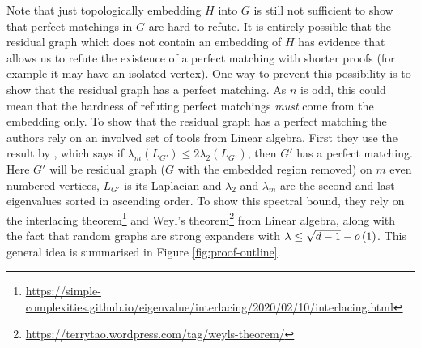 \documentclass[11pt]{article}
\begin{document}
Note that just topologically embedding $H$ into $G$ is still not sufficient to show that perfect matchings in $G$ are hard to refute.
It is entirely possible that the residual graph which does not contain an embedding of $H$ has evidence that allows us to refute the existence of a perfect matching with shorter proofs (for example it may have an isolated vertex).
One way to prevent this possibility is to show that the residual graph has a perfect matching.
As $n$ is odd, this could mean that the hardness of refuting perfect matchings \emph{must} come from the embedding only.
To show that the residual graph has a perfect matching the authors rely on an involved set of tools from Linear algebra.
First they use the result by \citet[Theorem 2.3]{brouwer2005eigenvalues}, which says if $\lambda_m(L_{G'}) \leq 2\lambda_2(L_{G'})$, then $G'$ has a perfect matching.
Here $G'$ will be residual graph ($G$ with the embedded region removed) on $m$ even numbered vertices, $L_{G'}$ is its Laplacian and $\lambda_2$ and $\lambda_m$ are the second and last eigenvalues sorted in ascending order. 
To show this spectral bound, they rely on the interlacing theorem\footnote{\url{https://simple-complexities.github.io/eigenvalue/interlacing/2020/02/10/interlacing.html}} and Weyl's theorem\footnote{\url{https://terrytao.wordpress.com/tag/weyls-theorem/}} from Linear algebra, along with the fact that random graphs are strong expanders with $\lambda \leq \sqrt{d-1} - o\left(1\right)$.
This general idea is summarised in Figure \ref{fig:proof-outline}.
\end{document}
